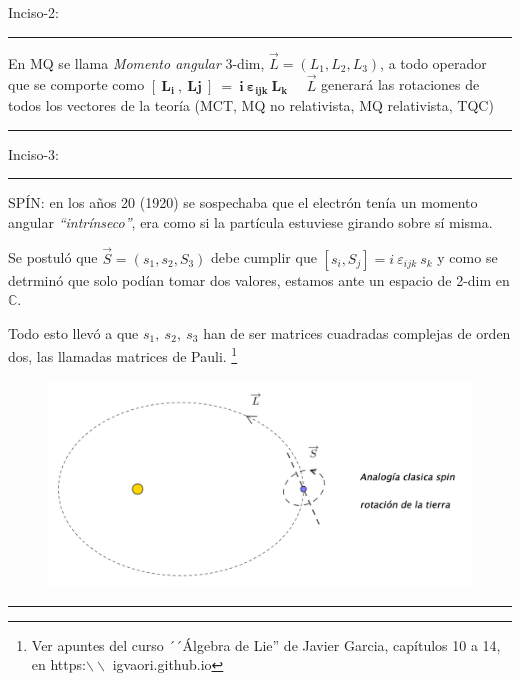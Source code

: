 \vspace{10mm}

Inciso-2: $\quad$ \rule{200pt}{0.1pt}

En MQ se llama \emph{Momento angular} 3-dim, $\overrightarrow L=(L_1,L_2,L_3)$, a todo operador que se comporte como $\boldsymbol{[\ L_i\ , \ Lj\ ] \ = \ i\ \varepsilon_{ijk}\ L_k}$
$\quad \overrightarrow L$ generará las rotaciones de todos los vectores de la teoría (MCT, MQ no relativista, MQ relativista, TQC)

\vspace{-1cm}
\begin{flushright}\rule{250pt}{0.1pt}	\end{flushright}

\vspace{5mm}

Inciso-3: $\quad$ \rule{200pt}{0.1pt}

SPÍN: en los años 20 (1920) se sospechaba que el electrón tenía un momento angular \emph{``intrínseco''}, era como si la partícula estuviese girando sobre sí misma.

Se postuló que $\overrightarrow S=(s_1,s_2,S_3)$ debe cumplir que $[s_i,S_j]=i\ \varepsilon_{ijk} \ s_k$ y como se detrminó que solo podían tomar dos valores, estamos ante un espacio de 2-dim en $\mathbb C$. 

Todo esto llevó a que $s_1, \ s_2, \ s_3$ han de ser matrices cuadradas complejas de orden dos, las llamadas matrices de Pauli. \footnote{ Ver apuntes del curso ´´Álgebra de Lie'' de Javier Garcia, capítulos 10 a 14, en https:$\backslash \backslash$ igvaori.github.io}

\begin{figure}[H]
	\centering
	\includegraphics[width=.75\textwidth]{imagenes/img22-01.png}
\end{figure}

\vspace{-1cm}
\begin{flushright}\rule{250pt}{0.1pt}	\end{flushright}

